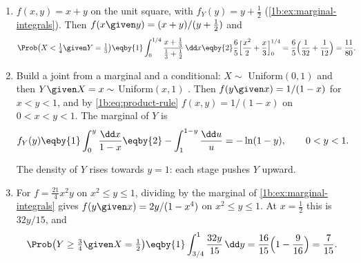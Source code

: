 \label{1b:ex:conditional}
\begin{enumerate}[label=(\alph*),leftmargin=1.6em,itemsep=2pt]
  \item $f(x,y)=x+y$ on the unit square, with $f_Y(y)=y+\tfrac12$
        (\cref{1b:ex:marginal-integrals}). Then $f(x\given y)=(x+y)/(y+\tfrac12)$
        and 
        \begin{align*}
          \Prob\bigl(X<\tfrac14\given Y=\tfrac13\bigr)
          &\eqby{1} \int_0^{1/4}\frac{x+\frac13}{\frac13+\frac12}\,\dd x
           \eqby{2} \frac65\Bigl[\frac{x^2}{2}+\frac{x}{3}\Bigr]_0^{1/4}
           = \frac65\Bigl(\frac1{32}+\frac1{12}\Bigr)
           = \frac{11}{80}.
        \end{align*}
  \item Build a joint from a marginal and a conditional: $X\sim$ Uniform$(0,1)$
        and then $Y\given X=x\sim$ Uniform$(x,1)$ . Then
        $f(y\given x)=1/(1-x)$ for $x<y<1$, and by \eqref{1b:eq:product-rule}
        $f(x,y)=1/(1-x)$ on $0<x<y<1$. The marginal of $Y$ is
        \begin{align*}
          f_Y(y)
          &\eqby{1} \int_0^y\frac{\dd x}{1-x}
           \eqby{2} -\int_1^{1-y}\frac{\dd u}{u}
           = -\ln(1-y),\qquad 0<y<1 .
        \end{align*}
        The density of $Y$ rises towards $y=1$: each stage pushes $Y$ upward.
  \item For $f=\tfrac{21}{4}x^2y$ on $x^2\le y\le1$, dividing by the
        marginal of \cref{1b:ex:marginal-integrals} gives
        $f(y\given x)=2y/(1-x^4)$ on $x^2\le y\le1$. At $x=\tfrac12$ this is
        $32y/15$, and 
        \begin{align*}
          \Prob\bigl(Y\ge\tfrac34\given X=\tfrac12\bigr)
          \eqby{1} \int_{3/4}^{1}\frac{32y}{15}\,\dd y
          = \frac{16}{15}\Bigl(1-\frac{9}{16}\Bigr)=\frac{7}{15}.
        \end{align*}
\end{enumerate}


